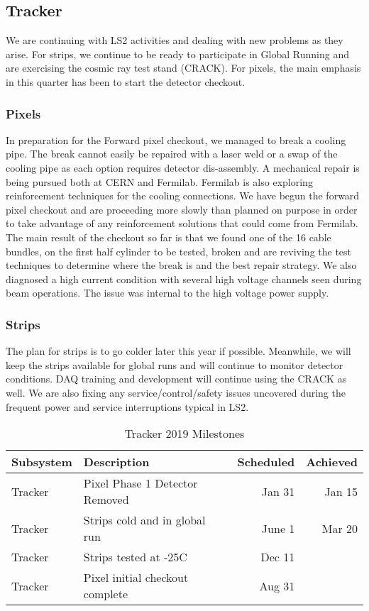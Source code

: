 \documentclass[12pt]{article}
\begin{document}
\subsection{Tracker }

We are continuing with LS2 activities and dealing with new problems as they arise. For strips, we continue to be ready to participate in Global Running and are exercising the cosmic ray test stand (CRACK). For pixels, the main emphasis in this quarter has been to start the detector checkout.

\subsubsection{Pixels }

In preparation for the Forward pixel checkout, we managed to break a cooling pipe.
The break cannot easily be repaired with a laser weld or a swap of the cooling pipe
as each option requires detector dis-assembly. A mechanical repair is being pursued both at CERN and Fermilab. Fermilab is also exploring reinforcement techniques for
the cooling connections. We have begun the forward pixel checkout and are
proceeding more slowly than planned on purpose in order to take advantage of any
reinforcement solutions that could come from Fermilab. The main result of the checkout so far is that we found one of the 16 cable bundles, on the first half
cylinder to be tested, broken and are reviving the test techniques to determine where the break
is and the best repair strategy. We also diagnosed a high current condition with
several high voltage channels seen during beam operations. The issue was internal to the high voltage power supply.


\subsubsection{Strips}

The plan for strips is to go colder later this year if possible. Meanwhile, we will keep the strips available for global runs and will continue to monitor detector
conditions. DAQ training and development will continue using the CRACK as well. We are also fixing any service/control/safety issues uncovered during the frequent
power and service interruptions typical in LS2.

\begin{table}[htp]
\caption{Tracker 2019 Milestones}
\begin{center}
\begin{tabular}{|l|l|r|r|}
\hline
Subsystem&Description&Scheduled&Achieved\\
\hline
Tracker & Pixel Phase 1 Detector Removed&Jan 31& Jan 15\\
\hline
Tracker & Strips cold and in global run& June 1& Mar 20\\
\hline
Tracker & Strips tested at -25C &Dec 11&\\
\hline
Tracker & Pixel initial checkout complete &Aug 31 & \\
\hline
\end{tabular}
\end{center}
\label{TrackerMilestones}
\end{table}%
\end{document}

